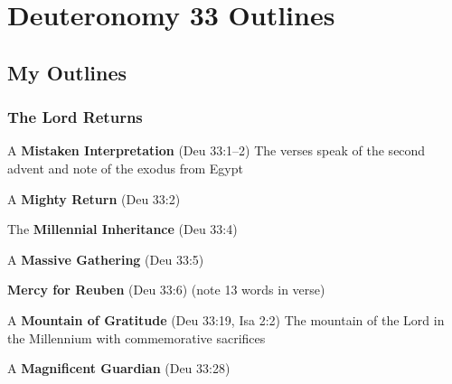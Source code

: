 \section{Deuteronomy 33 Outlines}


\subsection{My Outlines}

\subsubsection{The Lord Returns}
\begin{compactenum}[I.][7]
    \item A \textbf{Mistaken Interpretation} (Deu 33:1--2) The verses speak of the second advent and note of the exodus from Egypt
    \item A \textbf{Mighty Return} (Deu 33:2)
    \item The \textbf{Millennial Inheritance} (Deu 33:4)
    \item A \textbf{Massive Gathering} (Deu 33:5)
    \item \textbf{Mercy for Reuben} (Deu 33:6) (note 13 words in verse)
    \item A \textbf{Mountain of Gratitude} (Deu 33:19, Isa 2:2) The mountain of the Lord in the Millennium with commemorative sacrifices
    \item A \textbf{Magnificent Guardian} (Deu 33:28) 
\end{compactenum}

